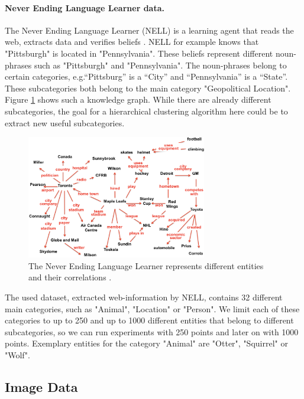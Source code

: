 \paragraph{Never Ending Language Learner data.} The Never Ending Language Learner (NELL) is a learning agent that reads the web, extracts data and verifies beliefs \cite{Mitchell:2015:NL:2886521.2886641, Mitchell:2018:NL:3210350.3191513}. NELL for example knows that "Pittsburgh" is located in "Pennsylvania". These beliefs represent different noun-phrases such as "Pittsburgh" and "Pennsylvania". The noun-phrases belong to certain categories, e.g.``Pittsburg'' is a ``City'' and ``Pennsylvania'' is a ``State''. These subcategories both belong to the main category "Geopolitical Location". Figure \ref{fig:nell_beliefs} shows such a knowledge graph. While there are already different subcategories, the goal for a hierarchical clustering algorithm here could be to extract new useful subcategories.

\begin{figure}[h]
    \centering
    \includegraphics[width=0.7\textwidth]{images/nell_beliefs}
    \caption{The Never Ending Language Learner represents different entities and their correlations \cite{Mitchell:2018:NL:3210350.3191513}.}
    \label{fig:nell_beliefs}
\end{figure}

The used dataset, extracted web-information by NELL, contains 32 different main categories, such as "Animal", "Location" or "Person". We limit each of these categories to up to 250 and up to 1000 different entities that belong to different subcategories, so we can run experiments with 250 points and later on with 1000 points. Exemplary entities for the category "Animal" are "Otter", "Squirrel" or "Wolf". 
\newpage
\subsection{Image Data}

